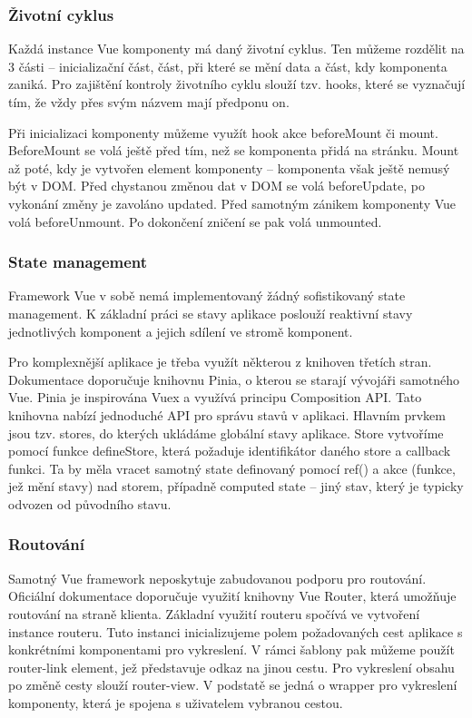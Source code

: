\subsubsection{Životní cyklus}

Každá instance Vue komponenty má daný životní cyklus. Ten můžeme rozdělit na 3 části -- inicializační část, část, při které se mění data a část, kdy komponenta zaniká. 
Pro zajištění kontroly životního cyklu slouží tzv. hooks, které se vyznačují tím, že vždy přes svým názvem mají předponu on.

Při inicializaci komponenty můžeme využít hook akce beforeMount či mount. BeforeMount se volá ještě před tím, než se komponenta přidá na stránku. 
Mount až poté, kdy je vytvořen element komponenty -- komponenta však ještě nemusý být v DOM. 
Před chystanou změnou dat v DOM se volá beforeUpdate, po vykonání změny je zavoláno updated. Před samotným zánikem komponenty Vue volá beforeUnmount. 
Po dokončení zničení se pak volá unmounted.\cite{vuemacrae,vue}

\subsubsection{State management}

Framework Vue v sobě nemá implementovaný žádný sofistikovaný state management. 
K základní práci se stavy aplikace poslouží reaktivní stavy jednotlivých komponent a jejich sdílení ve stromě komponent.

Pro komplexnější aplikace je třeba využít některou z knihoven třetích stran. Dokumentace doporučuje knihovnu Pinia, o kterou se starají vývojáři samotného Vue. 
Pinia je inspirována Vuex a využívá principu Composition API. Tato knihovna nabízí jednoduché API pro správu stavů v aplikaci. 
Hlavním prvkem jsou tzv. stores, do kterých ukládáme globální stavy aplikace. 
Store vytvoříme pomocí funkce defineStore, která požaduje identifikátor daného store a callback funkci. 
Ta by měla vracet samotný state definovaný pomocí ref() a akce (funkce, jež mění stavy) nad storem, případně computed state -- jiný stav, který je typicky odvozen od původního stavu.\cite{pinia,vue}

\subsubsection{Routování}

Samotný Vue framework neposkytuje zabudovanou podporu pro routování. Oficiální dokumentace doporučuje využití knihovny Vue Router, která umožňuje routování na straně klienta. 
Základní využití routeru spočívá ve vytvoření instance routeru. Tuto instanci inicializujeme polem požadovaných cest aplikace s konkrétními komponentami pro vykreslení. 
V rámci šablony pak můžeme použít router-link element, jež představuje odkaz na jinou cestu. Pro vykreslení obsahu po změně cesty slouží router-view. 
V podstatě se jedná o wrapper pro vykreslení komponenty, která je spojena s uživatelem vybranou cestou.


